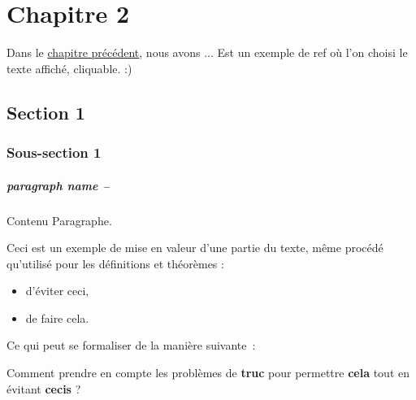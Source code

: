 \documentclass[french, a4paper, 11pt, twoside, pdftex]{StyleThese}
\begin{document}
\setcounter{chapter}{2} %
\dominitoc
\faketableofcontents
\fi

\chapter{Chapitre 2} \label{chap:2_StateofArt}
\minitoc

Dans le \hyperref[chap:1_EnjeuxIntro]{chapitre précédent}, nous avons ... Est un exemple de ref où l'on choisi le texte affiché, cliquable. :)

\section{Section 1}
    \subsection{Sous-section 1}


  \paragraph{paragraph name --}
   Contenu Paragraphe.

  Ceci est un exemple de mise en valeur d'une partie du texte, même procédé qu'utilisé pour les définitions et théorèmes :
   \begin{itemize}
   	\item 	d'éviter ceci,
   	\item   de faire cela.
   \end{itemize}
	Ce qui peut se formaliser de la manière suivante~:
	\begin{mdframed}[outerlinewidth=1.5pt,
	innerlinewidth=1.5pt,
	middlelinewidth=2pt,
	middlelinecolor=white,
	bottomline=false,topline=false,rightline=false]
	Comment prendre en compte les problèmes de \textbf{truc} pour permettre \textbf{cela} tout en évitant \textbf{cecis} ?
\end{mdframed}
\end{document}
